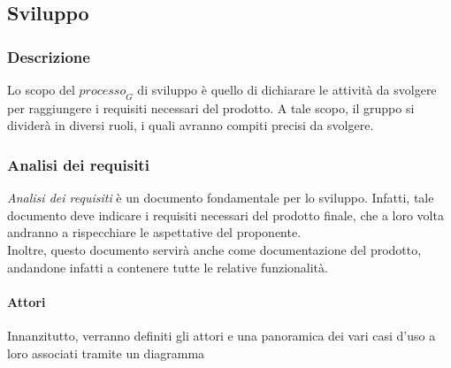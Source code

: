 \subsection{Sviluppo}
\subsubsection{Descrizione}
Lo scopo del $\textit{processo}_G$ di sviluppo è quello di dichiarare le attività da svolgere per raggiungere i requisiti necessari del prodotto.
A tale scopo, il gruppo si dividerà in diversi ruoli, i quali avranno compiti precisi da svolgere.
\subsubsection{Analisi dei requisiti}
\textit{Analisi dei requisiti} è un documento fondamentale per lo sviluppo. Infatti, tale documento deve indicare i requisiti necessari del prodotto finale, che a loro volta andranno a rispecchiare le aspettative del proponente. \\
Inoltre, questo documento servirà anche come documentazione del prodotto, andandone infatti a contenere tutte le relative funzionalità.
\paragraph{Attori} 
Innanzitutto, verranno definiti gli attori e una panoramica dei vari casi d'uso a loro associati tramite un diagramma
